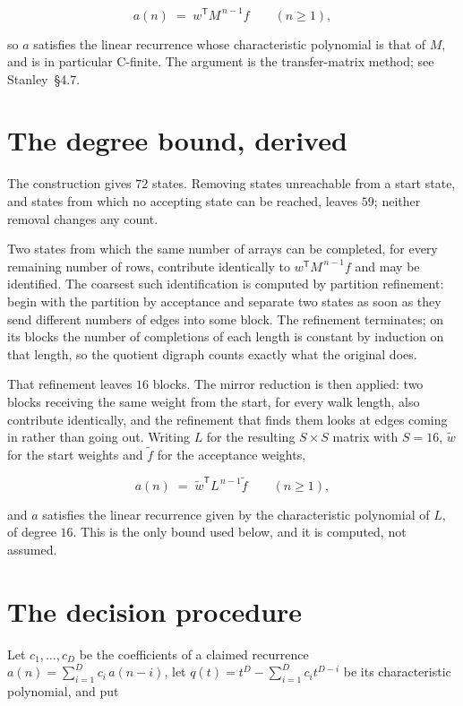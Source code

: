 \documentclass[11pt]{article}
\theoremstyle{definition}
\begin{document}
\[a(n) \;=\; w^{\mathsf T} M^{\,n-1} f \qquad (n \ge 1),\]

so $a$ satisfies the linear recurrence whose characteristic polynomial is that of $M$, and is in particular C-finite. The argument is the transfer-matrix method; see Stanley~\S4.7.

\section{The degree bound, derived}

The construction gives $72$ states. Removing states unreachable from a start state, and states from which no accepting state can be reached, leaves $59$; neither removal changes any count.

Two states from which the same number of arrays can be completed, for every remaining number of rows, contribute identically to $w^{\mathsf T}M^{\,n-1}f$ and may be identified. The coarsest such identification is computed by partition refinement: begin with the partition by acceptance and separate two states as soon as they send different numbers of edges into some block. The refinement terminates; on its blocks the number of completions of each length is constant by induction on that length, so the quotient digraph counts exactly what the original does.

That refinement leaves $16$ blocks. The mirror reduction is then applied: two blocks receiving the same weight from the start, for every walk length, also contribute identically, and the refinement that finds them looks at edges coming in rather than going out. Writing $L$ for the resulting $S \times S$ matrix with $S = 16$, $\tilde w$ for the start weights and $\tilde f$ for the acceptance weights,

\[a(n) \;=\; \tilde w^{\mathsf T} L^{\,n-1} \tilde f \qquad (n \ge 1),\]

and $a$ satisfies the linear recurrence given by the characteristic polynomial of $L$, of degree $16$. This is the only bound used below, and it is computed, not assumed.

\section{The decision procedure}

Let $c_1,\dots,c_D$ be the coefficients of a claimed recurrence $a(n) = \sum_{i=1}^{D} c_i\,a(n-i)$, let $q(t) = t^{D} - \sum_{i=1}^{D} c_i t^{D-i}$ be its characteristic polynomial, and put
\end{document}
